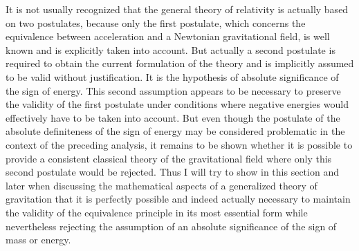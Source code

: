 \documentclass[notitlepage,12pt]{report}
\begin{document}
It is not usually recognized that the general theory of relativity is actually based on two postulates, because only the first postulate, which concerns the equivalence between acceleration and a Newtonian gravitational field, is well known and is explicitly taken into account. But actually a second postulate is required to obtain the current formulation of the theory and is implicitly assumed to be valid without justification. It is the hypothesis of absolute significance of the sign of energy. This second assumption appears to be necessary to preserve the validity of the first postulate under conditions where negative energies would effectively have to be taken into account. But even though the postulate of the absolute definiteness of the sign of energy may be considered problematic in the context of the preceding analysis, it remains to be shown whether it is possible to provide a consistent classical theory of the gravitational field where only this second postulate would be rejected. Thus I will try to show in this section and later when discussing the mathematical aspects of a generalized theory of gravitation that it is perfectly possible and indeed actually necessary to maintain the validity of the equivalence principle in its most essential form while nevertheless rejecting the assumption of an absolute significance of the sign of mass or energy.
\end{document}
